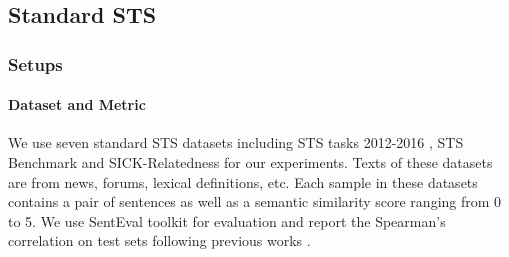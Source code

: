 \documentclass[11pt]{article}
\begin{document}
\begin{table*}[!t]
\caption{\label{tab: standard sts}
The performance of different sentence embedding models on test sets of STS tasks (Spearman’s correlation). The best performance and the second-best performance methods are denoted in bold and underlined fonts respectively. $\clubsuit$: results from \cite{ReimersG19sbert}; $\diamondsuit$: results from \cite{gao2021simcse}; $\heartsuit$: results from \cite{zhang-etal-2020-isbert}; $\spadesuit$: results from \cite{Yan2021consert}; $\dag$: results from \cite{liu2021mirrorbert}; $\ddag$: results from \cite{kim2021sgopt}; $\blacklozenge$: results from \cite{chuang2022diffcse}; $\vartriangle$: results from \cite{2022promptbert}; $*$ : results from our experiments; + EH: adding the Energy-based Hinge loss as shown in Equation (\ref{equation: total_loss}).
}
\end{table*}

\subsection{Standard STS}
\label{sec: standard sts}
\subsubsection{Setups}
\paragraph{Dataset and Metric}
We use seven standard STS datasets including STS tasks 2012-2016 \cite{sts12, sts13, sts14, sts15, sts16}, STS Benchmark \cite{stsb} and SICK-Relatedness \cite{sickr} for our experiments. Texts of these datasets are from news, forums, lexical definitions, etc. Each sample in these datasets contains a pair of sentences as well as a semantic similarity score ranging from 0 to 5. We use SentEval toolkit \cite{ConneauK18senteval} for evaluation and report the Spearman’s correlation on test sets following previous works \cite{ReimersG19sbert, gao2021simcse}.
\end{document}
